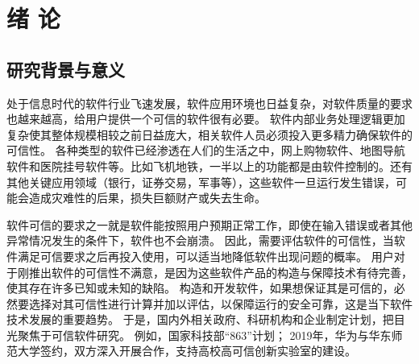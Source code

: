 \chapter{绪\hskip 0.4cm 论}
\label{chap1}



\section{研究背景与意义}

处于信息时代的软件行业飞速发展，软件应用环境也日益复杂，对软件质量的要求也越来越高，给用户提供一个可信的软件很有必要。
软件内部业务处理逻辑更加复杂使其整体规模相较之前日益庞大，相关软件人员必须投入更多精力确保软件的可信性。
各种类型的软件已经渗透在人们的生活之中，网上购物软件、地图导航软件和医院挂号软件等。比如飞机地铁，一半以上的功能都是由软件控制的。还有其他关键应用领域（银行，证券交易，军事等），这些软件一旦运行发生错误，可能会造成灾难性的后果，损失巨额财产或失去生命\cite{2009贝叶斯网络在软件可信性评估指标体系中的应用}。

软件可信的要求之一就是软件能按照用户预期正常工作，即使在输入错误或者其他异常情况发生的条件下，软件也不会崩溃\cite{Wang2006Trustworthiness}。
因此，需要评估软件的可信性，当软件满足可信要求之后再投入使用，可以适当地降低软件出现问题的概率。
用户对于刚推出软件的可信性不满意，是因为这些软件产品的构造与保障技术有待完善，使其存在许多已知或未知的缺陷。
构造和开发软件，如果想保证其是可信的，必然要选择对其可信性进行计算并加以评估，以保障运行的安全可靠，这是当下软件技术发展的重要趋势\cite{熊伟2010基于}。
于是，国内外相关政府、科研机构和企业制定计划，把目光聚焦于可信软件研究。
例如，国家科技部“863”计划；
2019年，华为与华东师范大学签约，双方深入开展合作，支持高校高可信创新实验室的建设。

